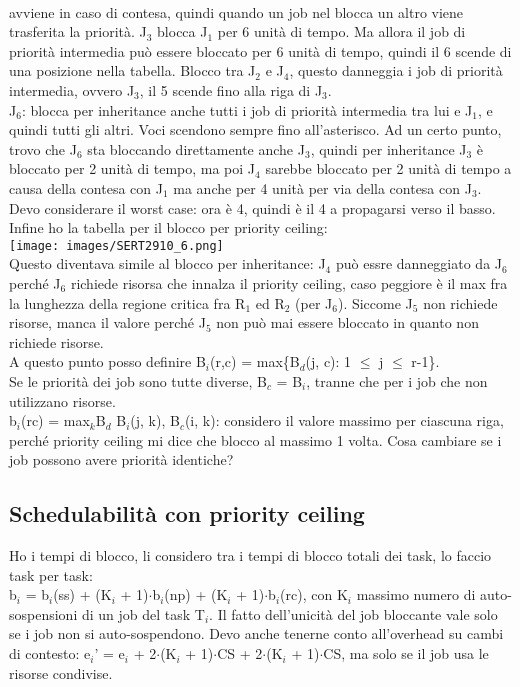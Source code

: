 \documentclass[18px]{article}
\begin{document}
\\avviene in caso di contesa, quindi quando un job nel blocca un altro viene trasferita la priorità. J$_{3}$ blocca J$_{1}$ per 6 unità di tempo. Ma allora il job di priorità intermedia può essere bloccato per 6 unità di tempo, quindi il 6 scende di una posizione nella tabella. Blocco tra J$_{2}$ e J$_{4}$, questo danneggia i job di priorità intermedia, ovvero J$_{3}$, il 5 scende fino alla riga di J$_{3}$.\\ J$_{6}$: blocca per inheritance anche tutti i job di priorità intermedia tra lui e J$_{1}$, e quindi tutti gli altri. Voci scendono sempre fino all'asterisco. Ad un certo punto, trovo che J$_{6}$ sta bloccando direttamente anche J$_{3}$, quindi per inheritance J$_{3}$ è bloccato per 2 unità di tempo, ma poi J$_{4}$ sarebbe bloccato per 2 unità di tempo a causa della contesa con J$_{1}$ ma anche per 4 unità per via della contesa con J$_{3}$. Devo considerare il worst case: ora è 4, quindi è il 4 a propagarsi verso il basso.\\ Infine ho la tabella per il blocco per priority ceiling:\\
\texttt{[image: images/SERT2910\_6.png]}\\
Questo diventava simile al blocco per inheritance: J$_{4}$ può essre danneggiato da J$_{6}$ perché J$_{6}$ richiede risorsa che innalza il priority ceiling, caso peggiore è il max fra la lunghezza della regione critica fra R$_{1}$ ed R$_{2}$ (per J$_{6}$). Siccome J$_{5}$ non richiede risorse, manca il valore perché J$_{5}$ non può mai essere bloccato in quanto non richiede risorse.\\ A questo punto posso definire B$_{i}$(r,c) = max\{B$_{d}$(j, c): 1 $\leq$ j $\leq$ r-1\}.\\ Se le priorità dei job sono tutte diverse, B$_{c}$ = B$_{i}$, tranne che per i job che non utilizzano risorse.\\ b$_{i}$(rc) = max$_{k}${B$_{d}$ B$_{i}$(j, k), B$_{c}$(i, k)}: considero il valore massimo per ciascuna riga, perché priority ceiling mi dice che blocco al massimo 1 volta. Cosa cambiare se i job possono avere priorità identiche?
\subsection{Schedulabilità con priority ceiling}
Ho i tempi di blocco, li considero tra i tempi di blocco totali dei task, lo faccio task per task:\\
b$_{i}$ = b$_{i}$(ss) + (K$_{i}$ + 1)$\cdot$b$_{i}$(np) + (K$_{i}$ + 1)$\cdot$b$_{i}$(rc), con K$_{i}$ massimo numero di auto-sospensioni di un job del task T$_{i}$. Il fatto dell'unicità del job bloccante vale solo se i job non si auto-sospendono. Devo anche tenerne conto all'overhead su cambi di contesto: e$_{i}$' = e$_{i}$ + 2$\cdot$(K$_{i}$ + 1)$\cdot$CS + 2$\cdot$(K$_{i}$ + 1)$\cdot$CS, ma solo se il job usa le risorse condivise.
\end{document}
